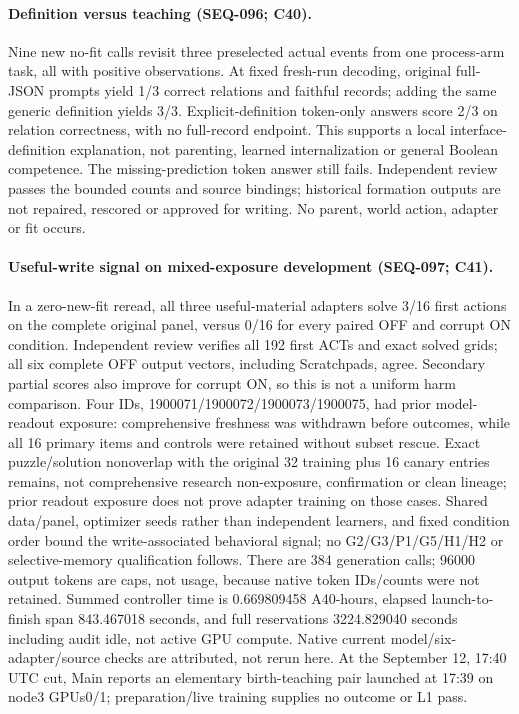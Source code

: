 \documentclass{article}
\begin{document}
\paragraph{Definition versus teaching (SEQ-096; C40).} Nine new no-fit calls revisit three preselected actual events from one process-arm task, all with positive observations. At fixed fresh-run decoding, original full-JSON prompts yield 1/3 correct relations and faithful records; adding the same generic definition yields 3/3. Explicit-definition token-only answers score 2/3 on relation correctness, with no full-record endpoint. This supports a local interface-definition explanation, not parenting, learned internalization or general Boolean competence. The missing-prediction token answer still fails. Independent review passes the bounded counts and source bindings; historical formation outputs are not repaired, rescored or approved for writing. No parent, world action, adapter or fit occurs.

\paragraph{Useful-write signal on mixed-exposure development (SEQ-097; C41).} In a zero-new-fit reread, all three useful-material adapters solve 3/16 first actions on the complete original panel, versus 0/16 for every paired OFF and corrupt ON condition. Independent review verifies all 192 first ACTs and exact solved grids; all six complete OFF output vectors, including Scratchpads, agree. Secondary partial scores also improve for corrupt ON, so this is not a uniform harm comparison. Four IDs, 1900071/1900072/1900073/1900075, had prior model-readout exposure: comprehensive freshness was withdrawn before outcomes, while all 16 primary items and controls were retained without subset rescue. Exact puzzle/solution nonoverlap with the original 32 training plus 16 canary entries remains, not comprehensive research non-exposure, confirmation or clean lineage; prior readout exposure does not prove adapter training on those cases. Shared data/panel, optimizer seeds rather than independent learners, and fixed condition order bound the write-associated behavioral signal; no G2/G3/P1/G5/H1/H2 or selective-memory qualification follows. There are 384 generation calls; 96000 output tokens are caps, not usage, because native token IDs/counts were not retained. Summed controller time is 0.669809458 A40-hours, elapsed launch-to-finish span 843.467018 seconds, and full reservations 3224.829040 seconds including audit idle, not active GPU compute. Native current model/six-adapter/source checks are attributed, not rerun here. At the September 12, 17:40 UTC cut, Main reports an elementary birth-teaching pair launched at 17:39 on node3 GPUs0/1; preparation/live training supplies no outcome or L1 pass.
\end{document}
